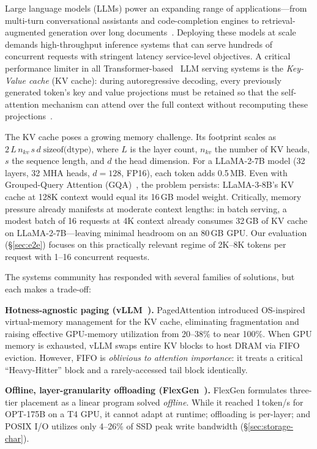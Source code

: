 \documentclass[conference]{IEEEtran}
\begin{document}
Large language models (LLMs) power an expanding range of applications---from multi-turn conversational assistants and code-completion engines to retrieval-augmented generation over long documents~\cite{llama2,llama3}. Deploying these models at scale demands high-throughput inference systems that can serve hundreds of concurrent requests with stringent latency service-level objectives. A critical performance limiter in all Transformer-based~\cite{transformer} LLM serving systems is the \emph{Key-Value cache} (KV cache): during autoregressive decoding, every previously generated token's key and value projections must be retained so that the self-attention mechanism can attend over the full context without recomputing these projections~\cite{vllm}.

The KV cache poses a growing memory challenge. Its footprint scales as $2\,L\,n_{kv}\,s\,d\;\text{sizeof(dtype)}$, where $L$ is the layer count, $n_{kv}$ the number of KV heads, $s$ the sequence length, and $d$ the head dimension. For a LLaMA-2-7B model (32 layers, 32 MHA heads, $d{=}128$, FP16), each token adds 0.5\,MB. Even with Grouped-Query Attention (GQA)~\cite{gqa}, the problem persists: LLaMA-3-8B's KV cache at 128K context would equal its 16\,GB model weight. Critically, memory pressure already manifests at moderate context lengths: in batch serving, a modest batch of 16 requests at 4K context already consumes 32\,GB of KV cache on LLaMA-2-7B---leaving minimal headroom on an 80\,GB GPU. Our evaluation (\S\ref{sec:e2e}) focuses on this practically relevant regime of 2K--8K tokens per request with 1--16 concurrent requests.


The systems community has responded with several families of solutions, but each makes a trade-off:

\textbf{Hotness-agnostic paging (vLLM~\cite{vllm}).} PagedAttention introduced OS-inspired virtual-memory management for the KV cache, eliminating fragmentation and raising effective GPU-memory utilization from 20--38\% to near 100\%. When GPU memory is exhausted, vLLM swaps entire KV blocks to host DRAM via FIFO eviction. However, FIFO is \emph{oblivious to attention importance}: it treats a critical ``Heavy-Hitter'' block and a rarely-accessed tail block identically.

\textbf{Offline, layer-granularity offloading (FlexGen~\cite{flexgen}).} FlexGen formulates three-tier placement as a linear program solved \emph{offline}. While it reached 1\,token/s for OPT-175B on a T4 GPU, it cannot adapt at runtime; offloading is per-layer; and POSIX I/O utilizes only 4--26\% of SSD peak write bandwidth (\S\ref{sec:storage-char}).
\end{document}
